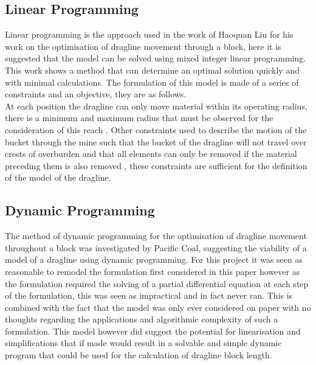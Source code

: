 \subsection{Linear Programming}
Linear programming is the approach used in the work of  Haoquan Liu for his work on the optimisation of dragline movement through a block, here it is suggested that the model can be solved using mixed integer linear programming\cite{A*Search}. This work shows a method that can determine an optimal solution quickly and with minimal calculations. The formulation of this model is made of a series of constraints and an objective, they are as follows.  \\
At each position the dragline can only move material within its operating radius, there is a minimum and maximum radius that must be observed for the consideration of this reach \cite{ORLeslie}. Other constraints used to describe the motion of the bucket through the mine such that the bucket of the dragline will not travel over crests of overburden\cite{ORLeslie} and that all elements can only be removed if the material preceding them is also removed \cite{ORLeslie}, these constraints are sufficient for the definition of the model of the dragline. 

\subsection{Dynamic Programming}
The method of dynamic programming for the optimisation of dragline movement throughout a block was investigated by Pacific Coal, suggesting the viability of a model of a dragline using dynamic programming.\cite{PacificCoal} For this project it was seen as reasonable to remodel the formulation first considered in this paper however as the formulation required the solving of a partial differential equation at each step of the formulation\cite{PacificCoal}, this was seen as impractical and in fact never ran. This is combined with the fact that the model was only ever considered on paper with no thoughts regarding the applications and algorithmic complexity of such a formulation. This model however did suggest the potential for linearisation and simplifications that if made would result in a solvable and simple dynamic program that could be used for the calculation of dragline block length. 


